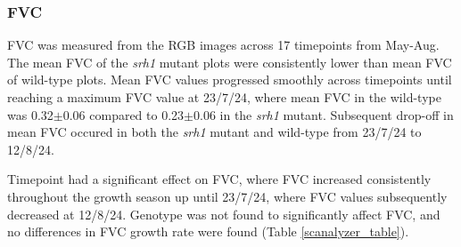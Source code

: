\documentclass{article}
\begin{document}
\subsubsection{FVC}
FVC was measured from the RGB images across 17 timepoints from May\hyp{}Aug.
The mean FVC of the \textit{srh1} mutant plots were consistently lower than mean
FVC of wild-type plots. Mean FVC values progressed smoothly across
timepoints until reaching a maximum FVC value at 23/7/24, where mean FVC in the
wild-type was 0.32$\pm$0.06 compared to 0.23$\pm$0.06 in the \textit{srh1}
mutant. Subsequent drop-off in mean FVC occured in both the \textit{srh1}
mutant and wild-type from 23/7/24 to 12/8/24.

Timepoint had a significant effect on FVC, where FVC increased consistently
throughout the growth season up until 23/7/24, where FVC values subsequently
decreased at 12/8/24. Genotype was not found to significantly affect FVC,
and no differences in FVC growth rate were found (Table \ref{scanalyzer_table}).
\end{document}
